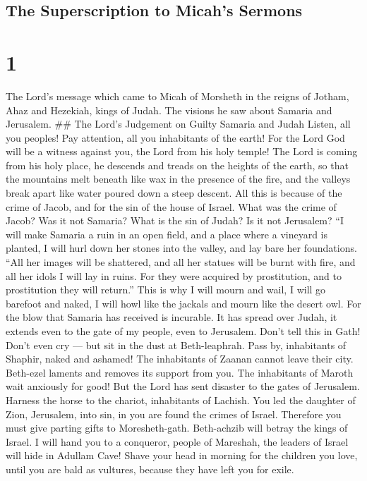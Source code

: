 \hypertarget{the-superscription-to-micahs-sermons}{%
\subsection{The Superscription to Micah's
Sermons}\label{the-superscription-to-micahs-sermons}}

\hypertarget{section}{%
\section{1}\label{section}}

 The Lord's message which came to Micah of Morsheth in the
reigns of Jotham, Ahaz and Hezekiah, kings of Judah. The visions he saw
about Samaria and Jerusalem. \#\# The Lord's Judgement on Guilty Samaria
and Judah  Listen, all you peoples! Pay attention, all you
inhabitants of the earth! For the Lord God will be a witness against
you, the Lord from his holy temple!  The Lord is coming from
his holy place, he descends and treads on the heights of the earth,
 so that the mountains melt beneath like wax in the presence
of the fire, and the valleys break apart like water poured down a steep
descent.  All this is because of the crime of Jacob, and for
the sin of the house of Israel. What was the crime of Jacob? Was it not
Samaria? What is the sin of Judah? Is it not Jerusalem?  ``I
will make Samaria a ruin in an open field, and a place where a vineyard
is planted, I will hurl down her stones into the valley, and lay bare
her foundations.  ``All her images will be shattered, and
all her statues will be burnt with fire, and all her idols I will lay in
ruins. For they were acquired by prostitution, and to prostitution they
will return.''  This is why I will mourn and wail, I will go
barefoot and naked, I will howl like the jackals and mourn like the
desert owl.  For the blow that Samaria has received is
incurable. It has spread over Judah, it extends even to the gate of my
people, even to Jerusalem.  Don't tell this in Gath! Don't
even cry --- but sit in the dust at Beth-leaphrah.  Pass
by, inhabitants of Shaphir, naked and ashamed! The inhabitants of Zaanan
cannot leave their city. Beth-ezel laments and removes its support from
you.  The inhabitants of Maroth wait anxiously for good!
But the Lord has sent disaster to the gates of Jerusalem. 
Harness the horse to the chariot, inhabitants of Lachish. You led the
daughter of Zion, Jerusalem, into sin, in you are found the crimes of
Israel.  Therefore you must give parting gifts to
Moresheth-gath. Beth-achzib will betray the kings of Israel.
 I will hand you to a conqueror, people of Mareshah, the
leaders of Israel will hide in Adullam Cave!  Shave your
head in morning for the children you love, until you are bald as
vultures, because they have left you for exile.

